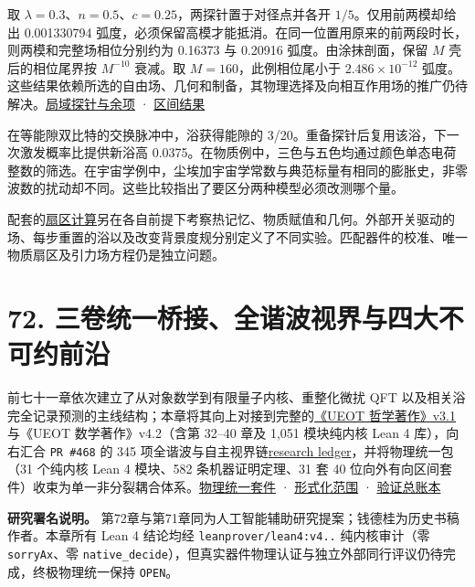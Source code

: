 \documentclass[
  11pt,
  oneside]{book}
\begin{document}
取 \(\lambda=0.3\)、\(n=0.5\)、\(c=0.25\)，两探针置于对径点并各开
\(1/5\)。仅用前两模却给出 0.001330794
弧度，必须保留高模才能抵消。在同一位置用原来的前两段时长，则两模和完整场相位分别约为
0.16373 与 0.20916 弧度。由涂抹剖面，保留 \(M\) 壳后的相位尾界按
\(M^{-10}\) 衰减。取 \(M=160\)，此例相位尾小于 \(2.486\times10^{-12}\)
弧度。这些结果依赖所选的自由场、几何和制备，其物理选择及向相互作用场的推广仍待解决。\href{../correlated_bath/field/FIELD.md}{局域探针与余项}
· \href{../correlated_bath/field/observed.json}{区间结果}

在等能隙双比特的交换脉冲中，浴获得能隙的
3/20。重备探针后复用该浴，下一次激发概率比提供新浴高
0.0375。在物质例中，三色与五色均通过颜色单态电荷整数的筛选。在宇宙学例中，尘埃加宇宙学常数与典范标量有相同的膨胀史，非零波数的扰动却不同。这些比较指出了要区分两种模型必须改测哪个量。

配套的\href{../correlated_bath/sectors/RESULTS.md}{扇区计算}另在各自前提下考察热记忆、物质赋值和几何。外部开关驱动的场、每步重置的浴以及改变背景度规分别定义了不同实验。匹配器件的校准、唯一物质扇区及引力场方程仍是独立问题。

\chapter{72. 三卷统一桥接、全谐波视界与四大不可约前沿}\label{ch-72}\hypertarget{ch-72}{}

前七十一章依次建立了从对象数学到有限量子内核、重整化微扰 QFT
以及相关浴完全记录预测的主线结构；本章将其向上对接到完整的\href{../../interfaces/PHILOSOPHY_MATHEMATICS_PHYSICS_UNIFICATION_MATRIX.md}{《UEOT
哲学著作》v3.1}与《UEOT 数学著作》v4.2（含第 32--40 章及 1,051
模块纯内核 Lean 4 库），向右汇合 \texttt{PR\ \#468} 的 345
项全谐波与自主视界链\href{../null_source/timelike/finite_stress/lapse_boundary/all_harmonic_horizon/README.md}{research
ledger}，并将物理统一包（31 个纯内核 Lean 4 模块、582 条机器证明定理、31
套 40
位向外有向区间套件）收束为单一非分裂耦合体系。\href{../../unification/README.md}{物理统一套件}
·
\href{../../../formalization/ueot-physics-unification/README.md}{形式化范围}
·
\href{../../../validation/physics_unification/VALIDATION_LEDGER.json}{验证总账本}

\textbf{研究署名说明。}
第72章与第71章同为人工智能辅助研究提案；钱德桂为历史书稿作者。本章所有
Lean 4 结论均经 \texttt{leanprover/\allowbreak lean4:v4..} 纯内核审计（零
\texttt{sorry\allowbreak Ax}、零
\texttt{native\_\allowbreak decide}），但真实器件物理认证与独立外部同行评议仍待完成，终极物理统一保持
\texttt{OPEN}。
\end{document}
